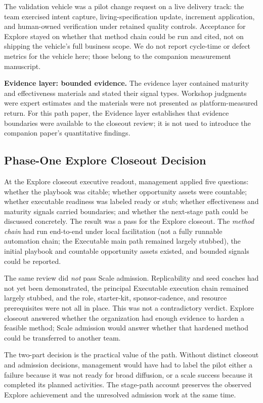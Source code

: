 \documentclass[10pt,conference]{IEEEtran}
\begin{document}
The validation vehicle was a pilot change request on a live delivery track:
the team exercised intent capture, living-specification update, increment
application, and human-owned verification under retained quality controls.
Acceptance for Explore stayed on whether that method chain could be run and
cited, not on shipping the vehicle's full business scope.
We do not report cycle-time or defect metrics for the vehicle here; those
belong to the companion measurement manuscript.

\textbf{Evidence layer: bounded evidence.}
The evidence layer contained maturity and effectiveness materials and stated
their signal types.  Workshop judgments were expert estimates and the
materials were not presented as platform-measured return.  For this path
paper, the Evidence layer establishes that evidence boundaries were available to the closeout review;
it is not used to introduce the companion paper's quantitative findings.

\subsection{Phase-One Explore Closeout Decision}

At the Explore closeout executive readout, management applied five questions: whether
the playbook was citable; whether opportunity assets were countable; whether
executable readiness was labeled ready or stub; whether effectiveness and
maturity signals carried boundaries; and whether the next-stage path could
be discussed concretely.  The result was a pass for the Explore closeout.  The
\emph{method chain} had run end-to-end under local facilitation (not a fully
runnable automation chain; the Executable main path remained largely stubbed),
the initial playbook and countable opportunity assets existed, and bounded
signals could be reported.

The same review did \emph{not} pass Scale admission.  Replicability and seed
coaches had not yet been demonstrated, the principal Executable execution chain
remained largely stubbed, and the role, starter-kit, sponsor-cadence, and
resource prerequisites were not all in place.  This was not a contradictory
verdict.  Explore closeout answered whether the organization had enough evidence to harden
a feasible method; Scale admission would answer whether that hardened method could be
transferred to another team.

The two-part decision is the practical value of the path.  Without distinct
closeout and admission decisions, management would have had to label the pilot
either a failure because it was not ready for broad diffusion, or a scale
success because it completed its planned activities.  The stage-path account
preserves the observed Explore achievement and the unresolved admission work
at the same time.
\end{document}
